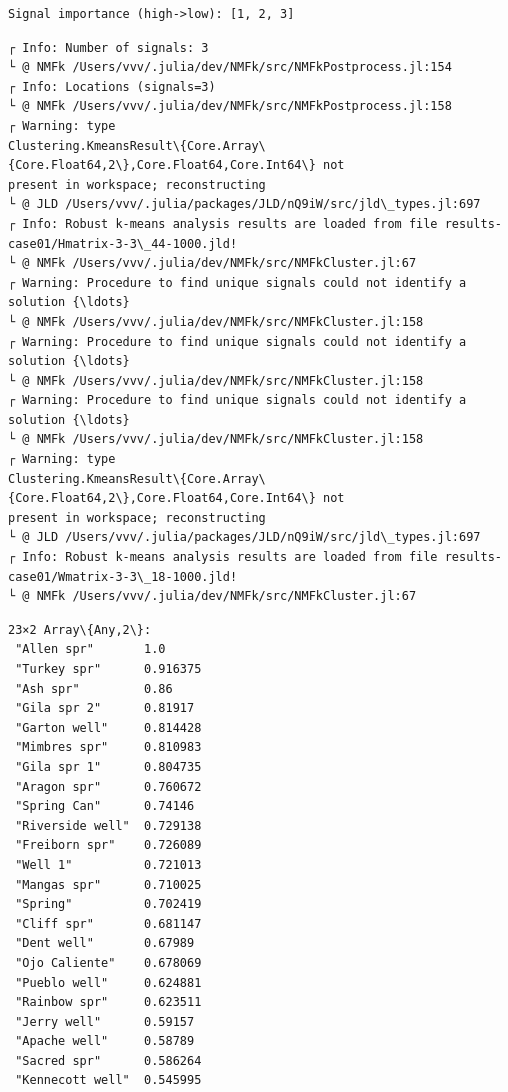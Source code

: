 \documentclass[11pt]{article}
\begin{document}
    \begin{Verbatim}[commandchars=\\\{\}]
Signal importance (high->low): [1, 2, 3]
    \end{Verbatim}

    \begin{Verbatim}[commandchars=\\\{\}]
┌ Info: Number of signals: 3
└ @ NMFk /Users/vvv/.julia/dev/NMFk/src/NMFkPostprocess.jl:154
┌ Info: Locations (signals=3)
└ @ NMFk /Users/vvv/.julia/dev/NMFk/src/NMFkPostprocess.jl:158
┌ Warning: type
Clustering.KmeansResult\{Core.Array\{Core.Float64,2\},Core.Float64,Core.Int64\} not
present in workspace; reconstructing
└ @ JLD /Users/vvv/.julia/packages/JLD/nQ9iW/src/jld\_types.jl:697
┌ Info: Robust k-means analysis results are loaded from file results-
case01/Hmatrix-3-3\_44-1000.jld!
└ @ NMFk /Users/vvv/.julia/dev/NMFk/src/NMFkCluster.jl:67
┌ Warning: Procedure to find unique signals could not identify a solution {\ldots}
└ @ NMFk /Users/vvv/.julia/dev/NMFk/src/NMFkCluster.jl:158
┌ Warning: Procedure to find unique signals could not identify a solution {\ldots}
└ @ NMFk /Users/vvv/.julia/dev/NMFk/src/NMFkCluster.jl:158
┌ Warning: Procedure to find unique signals could not identify a solution {\ldots}
└ @ NMFk /Users/vvv/.julia/dev/NMFk/src/NMFkCluster.jl:158
┌ Warning: type
Clustering.KmeansResult\{Core.Array\{Core.Float64,2\},Core.Float64,Core.Int64\} not
present in workspace; reconstructing
└ @ JLD /Users/vvv/.julia/packages/JLD/nQ9iW/src/jld\_types.jl:697
┌ Info: Robust k-means analysis results are loaded from file results-
case01/Wmatrix-3-3\_18-1000.jld!
└ @ NMFk /Users/vvv/.julia/dev/NMFk/src/NMFkCluster.jl:67
    \end{Verbatim}


    \begin{Verbatim}[commandchars=\\\{\}]
23×2 Array\{Any,2\}:
 "Allen spr"       1.0
 "Turkey spr"      0.916375
 "Ash spr"         0.86
 "Gila spr 2"      0.81917
 "Garton well"     0.814428
 "Mimbres spr"     0.810983
 "Gila spr 1"      0.804735
 "Aragon spr"      0.760672
 "Spring Can"      0.74146
 "Riverside well"  0.729138
 "Freiborn spr"    0.726089
 "Well 1"          0.721013
 "Mangas spr"      0.710025
 "Spring"          0.702419
 "Cliff spr"       0.681147
 "Dent well"       0.67989
 "Ojo Caliente"    0.678069
 "Pueblo well"     0.624881
 "Rainbow spr"     0.623511
 "Jerry well"      0.59157
 "Apache well"     0.58789
 "Sacred spr"      0.586264
 "Kennecott well"  0.545995
    \end{Verbatim}
\end{document}
